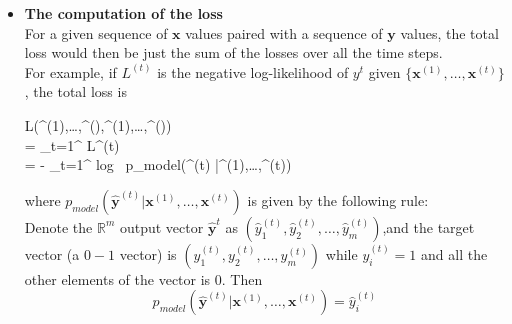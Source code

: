 \begin{itemize}
		\item
		\textbf{The computation of the loss} \\
		For a given sequence of $\mathbf{x}$ values paired with a sequence of $\mathbf{y}$ values, the total loss would then be just the sum of the losses over all the time steps.\\
		For example, if $L^{(t)}$ is the negative log-likelihood of $y^{t}$ given $\{\mathbf{x}^{(1)},\ldots,\mathbf{x}^{(t)} \}$, the total loss is
		\begin{flalign*}
		L({^{(1)},\ldots,^{(\tau)}},{^{(1)},\ldots,^{(\tau)}}) \\
		= \sum_{t=1}^{\tau} L^{(t)}  \\
		= - \sum_{t=1}^{\tau} log \ p_{model}(^{(t)} |{^{(1)},\ldots,^{(t)}}) 
		\end{flalign*}
		where $p_{model}(\mathbf{\hat{y}}^{(t)} |{\mathbf{x}^{(1)},\ldots,\mathbf{x}^{(t)}}) $ is given by the following rule:\\
		Denote the $\mathbb{R}^m$ output vector $\hat{\mathbf{y}}^{t}$ as $(\hat{y}_1^{(t)},\hat{y}_2^{(t)},\dots,\hat{y}_m^{(t)})$,and the target vector (a $0-1$ vector) is $(y_1^{(t)},y_2^{(t)},\dots,y_m^{(t)})$ while $y_i^{(t)} = 1$ and all the other elements of the vector is 0. Then 
		\begin{equation}
		p_{model}(\mathbf{\hat{y}}^{(t)} |{\mathbf{x}^{(1)},\ldots,\mathbf{x}^{(t)}}) = \hat{y}_i^{(t)}
		\end{equation}
	\end{itemize}

